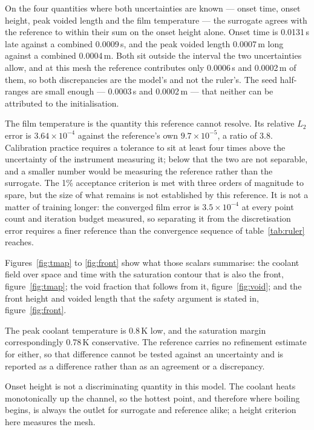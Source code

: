 \documentclass[11pt,a4paper]{article}
\begin{document}
On the four quantities where both uncertainties are known --- onset time, onset height,
peak voided length and the film temperature --- the surrogate agrees with the reference to
within their sum on the onset height alone. Onset time is 0.0131\,s late against a combined
0.0009\,s, and the peak voided length 0.0007\,m long against a combined 0.0004\,m. Both sit
outside the interval the two uncertainties allow, and at this mesh the reference contributes
only 0.0006\,s and 0.0002\,m of them, so both discrepancies are the model's and not the
ruler's. The seed half-ranges are small enough --- 0.0003\,s and 0.0002\,m --- that neither
can be attributed to the initialisation.

The film temperature is the quantity this reference cannot resolve. Its relative $L_2$ error
is $3.64\times10^{-4}$ against the reference's own $9.7\times10^{-5}$, a ratio of 3.8.
Calibration practice requires a tolerance to sit at least four times above the uncertainty
of the instrument measuring it; below that the two are not separable, and a smaller number
would be measuring the reference rather than the surrogate. The 1\% acceptance criterion is
met with three orders of magnitude to spare, but the size of what remains is not established
by this reference. It is not a matter of training longer: the converged film error is
$3.5\times10^{-4}$ at every point count and iteration budget measured, so separating it from
the discretisation error requires a finer reference than the convergence sequence of
table~\ref{tab:ruler} reaches.

Figures~\ref{fig:tmap} to \ref{fig:front} show what those scalars summarise: the coolant
field over space and time with the saturation contour that is also the front,
figure~\ref{fig:tmap}; the void fraction that follows from it, figure~\ref{fig:void}; and
the front height and voided length that the safety argument is stated in,
figure~\ref{fig:front}.

The peak coolant temperature is 0.8\,K low, and the saturation margin correspondingly
0.78\,K conservative. The reference carries no refinement estimate for either, so that
difference cannot be tested against an uncertainty and is reported as a difference rather
than as an agreement or a discrepancy.

Onset height is not a discriminating quantity in this model. The coolant heats
monotonically up the channel, so the hottest point, and therefore where boiling begins, is
always the outlet for surrogate and reference alike; a height criterion here measures the
mesh.
\end{document}
